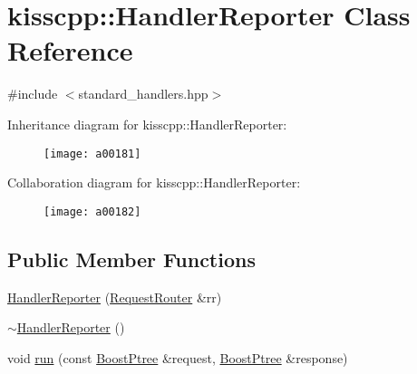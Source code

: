 \hypertarget{a00027}{\section{kisscpp\-:\-:Handler\-Reporter Class Reference}
\label{a00027}
}


{\ttfamily \#include $<$standard\-\_\-handlers.\-hpp$>$}



Inheritance diagram for kisscpp\-:\-:Handler\-Reporter\-:\nopagebreak
\begin{figure}[H]
\begin{center}
\leavevmode
\texttt{[image: a00181]}
\end{center}
\end{figure}


Collaboration diagram for kisscpp\-:\-:Handler\-Reporter\-:\nopagebreak
\begin{figure}[H]
\begin{center}
\leavevmode
\texttt{[image: a00182]}
\end{center}
\end{figure}
\subsection*{Public Member Functions}
\begin{DoxyCompactItemize}
\item 
\hyperlink{a00027_a3453f6a6fa7a265c64d10703be4ba0bd}{Handler\-Reporter} (\hyperlink{a00038}{Request\-Router} \&rr)
\item 
\hyperlink{a00027_a8fa462a342186238f7a3e956b936d9b4}{$\sim$\-Handler\-Reporter} ()
\item 
void \hyperlink{a00027_a5085be2e4dcfa1e98bf517c8d0b5443f}{run} (const \hyperlink{a00048_ab36820650b8e0db36402aea80485633c}{Boost\-Ptree} \&request, \hyperlink{a00048_ab36820650b8e0db36402aea80485633c}{Boost\-Ptree} \&response)
\end{DoxyCompactItemize}


